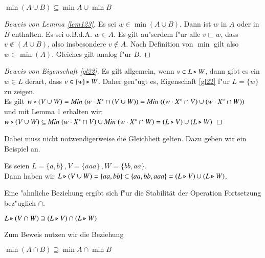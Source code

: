 \vspace{2ex}

\begin{lem}\label{lem123}
$\min (A\cup B) \subseteq \min A \cup \min B$
\end{lem}

\begin{proof}[Beweis von Lemma \ref{lem123}]
Es sei $w\in \min (A\cup B)$. Dann ist $w$ in $A$ oder in $B$ enthalten. Es sei o.B.d.A. $w\in A$. Es gilt au"serdem f"ur alle $v\sqsubset w$, dass $v\notin (A\cup B)$, also insbesondere $v\notin A$. Nach Definition von $\min$ gilt also $w\in\min(A)$. Gleiches gilt analog f"ur $B$.
\end{proof}
\begin{proof}[Beweis von Eigenschaft \ref{gl22}]
Es gilt allgemein, wenn $v\in L\triangleright W$, dann gibt es ein $w\in L$ derart, dass $v\in \{w\}\triangleright W$. 
Daher gen"ugt es, Eigenschaft \ref{gl22} f"ur $L=\{w\}$ zu zeigen.\\
Es gilt $w \triangleright (V\cup W)=\mathit{Min}\; (w\cdot X^* \cap (V\cup W)) =\mathit{Min}\; ((w\cdot X^* \cap V) \cup (w\cdot X^* \cap W))$\\
und mit Lemma 1 erhalten wir:\\
$ w\triangleright (V\cup W) \subseteq \mathit{Min}\; (w\cdot X^* \cap V) \cup \mathit{Min}\; (w\cdot X^* \cap W)=(L\triangleright V)\cup (L\triangleright W)$
\end{proof}
Dabei muss nicht notwendigerweise die Gleichheit gelten. Dazu geben wir ein Beispiel an.

\vspace{2ex}

\begin{beispiel}
Es seien $L= \{a,b\}\, ,V =\{aaa\}\, ,W = \{bb,aa\}$. \\Dann haben wir $L\triangleright (V\cup W)=\{aa,bb\} \subset \{aa,bb,aaa\} = (L\triangleright V) \cup (L\triangleright W)$.
\end{beispiel}

Eine "ahnliche Beziehung ergibt sich f"ur die Stabilität der Operation Fortsetzung bez"uglich $\cap$.

\vspace{2ex}

\begin{eigen}\label{eigen321}
$L\triangleright (V\cap W)\supseteq (L\triangleright V) \cap (L\triangleright W)$
\end{eigen}
Zum Beweis nutzen wir die Beziehung

\vspace{2ex}

\begin{lem}\label{lem321}
$\min(A\cap B) \supseteq \min A \cap \min B$
\end{lem}

